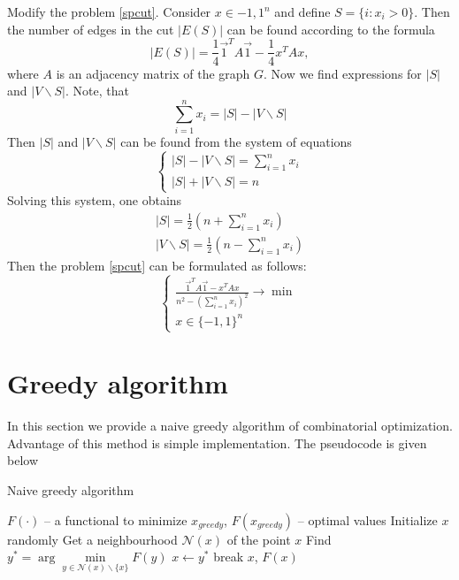 \documentclass[12pt]{article}
\begin{document}
Modify the problem \ref{spcut}.
Consider $x \in {-1, 1}^n$ and define $S = \{ i : x_i > 0 \}$.
Then the number of edges in the cut $|E(S)|$ can be found according to the formula 
\[
	| E(S) | = \frac14 \vec 1^T A \vec 1 - \frac14 x^T A x,
\]
where $A$ is an adjacency matrix of the graph $G$.
Now we find expressions for $|S|$ and $|V\backslash S|$.
Note, that
\[
	\sum\limits_{i=1}^n x_i = |S| - |V\backslash S|
\]
Then $|S|$ and $|V\backslash S|$ can be found from the system of equations
\[
	\begin{cases}
		|S| - |V\backslash S| = \sum\limits_{i=1}^n x_i\\
		|S| + |V\backslash S| = n
	\end{cases}
\]
Solving this system, one obtains
\begin{gather}
\label{1}
	|S| = \frac12 \left( n + \sum\limits_{i=1}^n x_i \right) \\
	|V \backslash S| = \frac12 \left( n - \sum\limits_{i=1}^n x_i \right)
\end{gather}
Then the problem \ref{spcut} can be formulated as follows:
\begin{equation}
\label{spcut1}
	\begin{cases}
		\frac{ \vec 1^T A \vec 1 - x^T A x }{ n^2 - \left( \sum\limits_{i=1}^n x_i 
		\right)^2 } 
		\longrightarrow \min \\
		x \in \{-1, 1\}^n
	\end{cases}
\end{equation} 

	
		
\section{Greedy algorithm}

In this section we provide a naive greedy algorithm of combinatorial optimization.
Advantage of this method is simple implementation.
The pseudocode is given below

\begin{algorithm}[H]
	\caption{Naive greedy algorithm}
	\label{greedy}
	\begin{algorithmic}[1]
		\Require $F(\cdot)$ -- a functional to minimize
		\Ensure $x_{greedy}$, $F(x_{greedy})$ -- optimal values
		\State Initialize $x$ randomly
			\State Get a neighbourhood $\mathcal N(x)$ of the point $x$
			\State Find $y^* = \arg\min\limits_{y \in \mathcal N(x) \backslash \{x\}} F(y)$ 
				\State $x \gets y^*$
			\Else
				\State break
			\EndIf
		\EndWhile
		 $x$, $F(x)$
	\end{algorithmic}
\end{algorithm}
\end{document}
